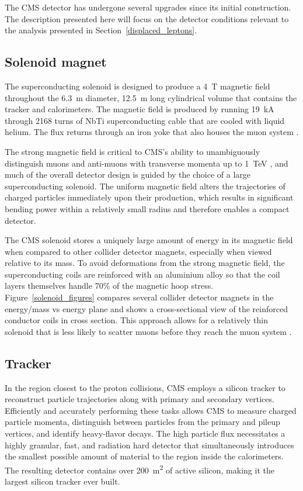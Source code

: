 The CMS detector has undergone several upgrades since its initial construction. The description presented here will focus on the detector conditions relevant to the analysis presented in Section~\ref{displaced_leptons}.

\subsection{Solenoid magnet}
The superconducting solenoid is designed to produce a \SI{4}{\tesla} magnetic field throughout the \SI{6.3}{\metre} diameter, \SI{12.5}{\metre} long cylindrical volume that contains the tracker and calorimeters. The magnetic field is produced by running \SI{19}{\kA} through 2168 turns of NbTi superconducting cable that are cooled with liquid helium. The flux returns through an iron yoke that also houses the muon system \cite{cms_experiment}.

The strong magnetic field is critical to CMS's ability to unambiguously distinguish muons and anti-muons with transverse momenta up to \SI{1}{\TeV} \cite{cms_tdr_v1}, and much of the overall detector design is guided by the choice of a large superconducting solenoid. The uniform magnetic field alters the trajectories of charged particles immediately upon their production, which results in significant bending power within a relatively small radius and therefore enables a compact detector.

The CMS solenoid stores a uniquely large amount of energy in its magnetic field when compared to other collider detector magnets, especially when viewed relative to its mass. To avoid deformations from the strong magnetic field, the superconducting coils are reinforced with an aluminium alloy so that the coil layers themselves handle 70\% of the magnetic hoop stress. Figure~\ref{solenoid_figures} compares several collider detector magnets in the energy/mass vs energy plane and shows a cross-sectional view of the reinforced conductor coils in cross section. This approach allows for a relatively thin solenoid that is less likely to scatter muons before they reach the muon system \cite{cms_experiment}. 



\subsection{Tracker}
\label{tracker}
In the region closest to the proton collisions, CMS employs a silicon tracker to reconstruct particle trajectories along with primary and secondary vertices. Efficiently and accurately performing these tasks allows CMS to measure charged particle momenta, distinguish between particles from the primary and pileup vertices, and identify heavy-flavor decays. The high particle flux necessitates a highly granular, fast, and radiation hard detector that simultaneously introduces the smallest possible amount of material to the region inside the calorimeters. The resulting detector contains over \SI{200}{\m\tothe{2}} of active silicon, making it the largest silicon tracker ever built.

